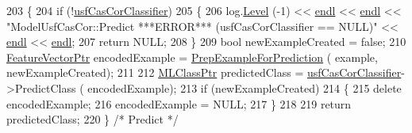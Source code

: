 \begin{DoxyCode}
203 \{
204   \textcolor{keywordflow}{if}  (!\hyperlink{class_k_k_m_l_l_1_1_model_usf_cas_cor_a7aeb7274e64e73ccfeea3a9da6633d60}{usfCasCorClassifier})
205   \{
206     log.\hyperlink{class_k_k_b_1_1_run_log_a32cf761d7f2e747465fd80533fdbb659}{Level} (-1) << \hyperlink{namespace_k_k_b_ad1f50f65af6adc8fa9e6f62d007818a8}{endl} << \hyperlink{namespace_k_k_b_ad1f50f65af6adc8fa9e6f62d007818a8}{endl} << \textcolor{stringliteral}{"ModelUsfCasCor::Predict   ***ERROR***     
       (usfCasCorClassifier == NULL)"} << \hyperlink{namespace_k_k_b_ad1f50f65af6adc8fa9e6f62d007818a8}{endl} << \hyperlink{namespace_k_k_b_ad1f50f65af6adc8fa9e6f62d007818a8}{endl};
207     \textcolor{keywordflow}{return} NULL;
208   \}
209   \textcolor{keywordtype}{bool}  newExampleCreated = \textcolor{keyword}{false};
210   \hyperlink{class_k_k_m_l_l_1_1_feature_vector}{FeatureVectorPtr}  encodedExample = \hyperlink{class_k_k_m_l_l_1_1_model_a31b972adfb64769b3ae966debec824fd}{PrepExampleForPrediction} (
      example, newExampleCreated);
211 
212   \hyperlink{class_k_k_m_l_l_1_1_m_l_class}{MLClassPtr}  predictedClass = \hyperlink{class_k_k_m_l_l_1_1_model_usf_cas_cor_a7aeb7274e64e73ccfeea3a9da6633d60}{usfCasCorClassifier}->PredictClass (
      encodedExample);
213   \textcolor{keywordflow}{if}  (newExampleCreated)
214   \{
215     \textcolor{keyword}{delete} encodedExample;
216     encodedExample = NULL;
217   \}
218 
219   \textcolor{keywordflow}{return}  predictedClass;
220 \}  \textcolor{comment}{/* Predict */}
\end{DoxyCode}
